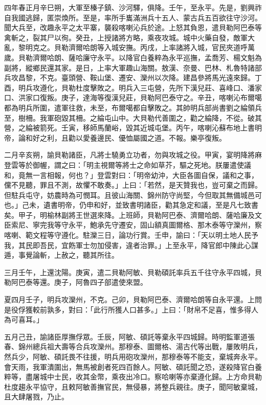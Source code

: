 \begin{pinyinscope}
四年春正月辛巳朔，大軍至榛子鎮、沙河驛，俱降。壬午，至永平。先是，劉興祚自我國逃歸，匿崇煥所。至是，率所手巂滿洲兵十五人、蒙古兵五百欲往守沙河。聞大兵至，改趣永平之太平寨，襲殺喀喇沁兵於途。上怒其負恩，遣貝勒阿巴泰等禽斬之，裂其尸以徇。癸丑，上授諸將方略，乘夜攻城。城中火藥自發，敵軍大亂，黎明克之。貝勒濟爾哈朗等入城安撫。丙戌，上率諸將入城，官民夾道呼萬歲。貝勒濟爾哈朗、薩哈廉守永平。以降官白養粹為永平巡撫，孟喬芳、楊文魁為副將，縱鄉民還其家。是日，上率大軍趣山海關。敖漢、奈曼、巴林、札魯特諸部兵攻昌黎，不克。臺頭營、鞍山堡、遷安、灤州以次降。建昌參將馬光遠來歸。丁酉，明兵攻遵化，貝勒杜度擊敗之。明兵入三屯營，先所下漢兒莊、喜峰口、潘家口、洪家口復叛。庚子，達海等復漢兒莊，貝勒阿巴泰守之。辛丑，喀喇沁布爾噶都為明兵所圍，遣軍往救，未至，布爾噶都自擊敗之。其帥明兵部尚書劉之綸領兵至，樹柵。我軍砲毀其柵。之綸屯山中。大貝勒代善圍之，勸之綸降，不從。破其營，之綸被箭死。壬寅，移師馬蘭峪，毀其近城屯堡。丙午，喀喇沁蘇布地上書明帝，論和好之利，且勸以愛養邊民、優恤屬國之道。不報。樂亭復叛。

二月辛亥朔，諭貝勒諸臣，凡將士驍勇立功者，勿與攻城之役。甲寅，宴明降將麻登雲等於御幄，謂之曰：「明主視爾等將士之命如草芥，驅之死地。朕屢遣使議和，竟無一言相報，何也？」登雲對曰：「明帝幼沖，大臣各圖自保，議和之事，儻不見聽，罪且不測，故懼不敢奏。」上曰：「若然，是天贊我也，豈可棄之而歸。但駐兵屯守，妨農時為可憫耳。且彼山海關、錦州防守尚堅，今但取其無備城邑可也。」己未，遺書明帝，仍申和好，並致書明諸臣，勸其急定和議，至是凡七致書矣。甲子，明榆林副將王世選來降。上班師，貝勒阿巴泰、濟爾哈朗、薩哈廉及文臣索尼、寧完我等守永平，鮑承先守遷安，固山額真圖爾格、那木泰等守灤州，察喀喇、範文程等守遵化。駐灤三日，論功行賞。壬申，諭曰：「天以明土地人民予我，其民即吾民，宜飭軍士勿加侵害，違者治罪。」上至永平，降官郎中陳此心謀遁，事覺論斬，上赦之，聽其所往。

三月壬午，上還沈陽。庚寅，遣二貝勒阿敏、貝勒碩託率兵五千往守永平四城，貝勒阿巴泰等還。庚子，阿魯四子部遣使來盟。

夏四月壬子，明兵攻灤州，不克。己卯，貝勒阿巴泰、濟爾哈朗等自永平還。上問是役俘獲較前孰多，對曰：「此行所獲人口甚多。」上曰：「財帛不足喜，惟多得人為可喜耳。」

五月己丑，諭諸臣厚撫俘眾。壬辰，阿敏、碩託等棄永平四城歸。時明監軍道張春、錦州總兵祖大壽等合兵攻灤州。那穆泰、圖爾格、湯古代等出戰，屢敗明兵，然兵少，阿敏、碩託畏不往援，明兵用砲攻灤州，那穆泰等不能支，棄城奔永平。會天雨，我軍潰圍出，無馬被創者死四百餘人。阿敏、碩託聞之恐，遂殺降官白養粹等，盡屠城中士民，收其金幣，乘夜出冷口。察哈喇等亦棄遵化歸。上方命貝勒杜度趨永平協守，且敕阿敏善撫官民，無侵暴，將整兵親往。庚子，聞阿敏棄城，且大肆屠戮，乃止。


\end{pinyinscope}

